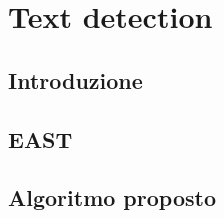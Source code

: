 \chapter{Text detection}
\label{text-detection}

\section{Introduzione}
\section{EAST}
\section{Algoritmo proposto}
